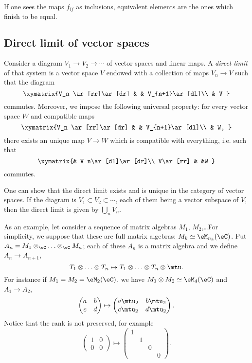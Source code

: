 If one sees the maps $f_{ij}$ as inclusions, equivalent elements are the ones which finish to be equal.

\subsection{Direct limit of vector spaces}

Consider a diagram $V_1\to V_2\to\cdots$ of vector spaces and linear maps. A \emph{direct limit} of that system is a vector space $V$ endowed with a collection of maps $V_n\to V$ such that the diagram
\[
  \xymatrix{%
   V_n \ar[rr]\ar[dr]		&		&	V_{n+1}\ar[dl]\\
				& V
}
\]
commutes. Moreover, we impose the following universal property: for every vector space $W$ and compatible maps
\[
  \xymatrix{%
   V_n \ar[rr]\ar[dr]		&		&	V_{n+1}\ar[dl]\\
				& W,
}
\]
there exists an unique map $V\to W$ which is compatible with everything, i.e. such that
\[
  \xymatrix{%
		& V_n\ar[dl]\ar[dr]\\
   V\ar[rr]		&			&W
}
\]
commutes.

One can show that the direct limit exists and is unique in the category of vector spaces. If the diagram is $V_1\subset V_2\subset \cdots$, each of them being a vector subspace of $V$, then the direct limit is given by $\bigcup_nV_n$.

As an example\label{PgExDirectLimVS}, let consider a sequence of matrix algebras $M_1$, $M_2$,\ldots For simplicity, we suppose that these are full matrix algebras: $M_k\simeq \eM_{n_k}(\eC)$. Put $A_n=M_1\otimes_{\eC}\ldots\otimes_{\eC} M_n$; each of these $A_n$ is a matrix algebra and we define $A_n\to A_{n+1}$,
\[
  T_1\otimes\ldots\otimes T_n\mapsto T_1\otimes\ldots\otimes T_n\otimes\mtu.
\]
For instance if $M_1=M_2=\eM_2(\eC)$, we have $M_1\otimes M_2\simeq\eM_4(\eC)$ and $A_1\to A_2$,
\[
  \begin{pmatrix}
a&b\\
c&d
\end{pmatrix}
\mapsto
\begin{pmatrix}
a\mtu_2 & b\mtu_2\\
c\mtu_2 & d\mtu_2
\end{pmatrix}.
\]
Notice that the rank is not preserved, for example
\[
  \begin{pmatrix}
1&0\\
0&0
\end{pmatrix}
\mapsto
\begin{pmatrix}
1 \\
&1\\
&&0\\
&&&0
\end{pmatrix}.
\]


